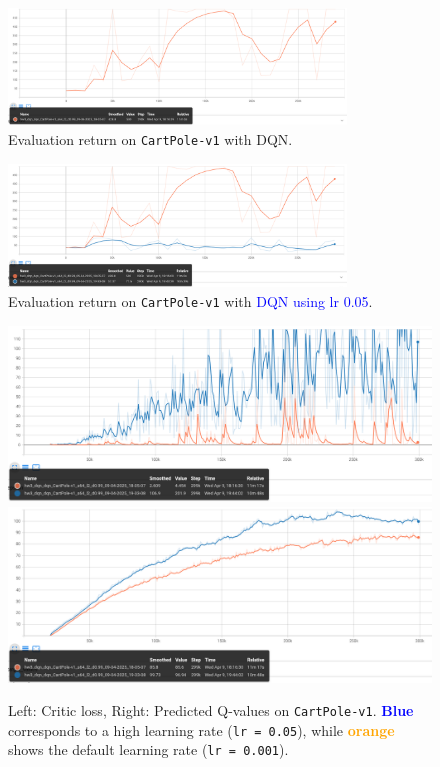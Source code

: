 \documentclass{article}
\begin{document}
\begin{figure}[h]
    \centering
    \includegraphics[width=0.8\textwidth]{imgs/hw3_dqn_CartPole_v1.png}
    \caption{Evaluation return on \texttt{CartPole-v1} with DQN.}
    \label{fig:cartpole}
\end{figure}

\begin{figure}[h]
  \centering
  \includegraphics[width=0.8\textwidth]{imgs/hw3_dqn_CartPole_v1_lr005_eval_return.png}
  \caption{Evaluation return on \texttt{CartPole-v1} with \textcolor{blue}{DQN using lr 0.05}.}
  \label{fig:cartpole_high_lr}
\end{figure}

\begin{figure}[H]
  \centering
  \includegraphics[width=0.49\linewidth]{imgs/hw3_dqn_CartPole_v1_lr005_critic_loss.png}
  \includegraphics[width=0.49\linewidth]{imgs/hw3_dqn_CartPole_v1_lr005_q_values.png}
  \caption{Left: Critic loss, Right: Predicted Q-values on \texttt{CartPole-v1}. 
  \textcolor{blue}{\textbf{Blue}} corresponds to a high learning rate (\texttt{lr = 0.05}), while 
  \textcolor{orange}{\textbf{orange}} shows the default learning rate (\texttt{lr = 0.001}).}
  \label{fig:cartpole_high_lr_q_and_loss}
\end{figure}
\end{document}
